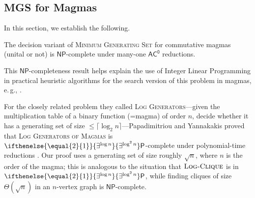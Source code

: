 \documentclass{theoretics}
\newcommand{\algprobm}[1]{\textsc{#1}\xspace}
\newcommand{\betacc}[1]{\ifthenelse{\equal{#1}{1}}{\exists^{\log n}}{\exists^{\log^{#1}n}}} %
\newcommand*{\ComplexityClass}[1]{\ensuremath{\mathsf{#1}}\xspace}
\newcommand*{\NP}{\ComplexityClass{NP}}
\renewcommand{\P}{\ComplexityClass{P}}
\newcommand{\ACz}{\ComplexityClass{AC^0}}
\begin{document}
\subsection{MGS for Magmas}

In this section, we establish the following.

\begin{theorem} \label{thm:magma}
    The decision variant of \algprobm{Minimum Generating Set} for commutative magmas (unital or not) is \NP-complete under many-one $\ACz$ reductions.
\end{theorem}


This \NP-completeness result helps explain the use of Integer Linear Programming in practical heuristic algorithms for the search version of this problem in magmas, e.\,g., \cite{JMV}.

For the closely related problem they called \algprobm{Log Generators}---given the multiplication table of a binary function (=magma) of order $n$, decide whether it has a generating set of size $\leq \lceil \log_2 n \rceil$---Papadimitriou and Yannakakis  proved that \algprobm{Log Generators of Magmas} is $\betacc{2} \mathsf{P}$-complete under polynomial-time reductions \cite[Thm.~7]{PY}. 
%
Our proof uses a generating set of size roughly $\sqrt{n}$, where $n$ is the order of the magma; this is analogous to the situation that $\algprobm{Log-Clique}$ is in $\betacc{2} \P$, while finding cliques of size $\Theta(\sqrt{n})$ in an $n$-vertex graph is $\NP$-complete.
\end{document}
